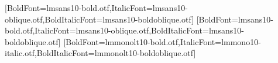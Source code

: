 \RequirePackage{fontspec}
\RequirePackage{unicode-math}
\setmainfont{lmsans10-regular.otf}[BoldFont=lmsans10-bold.otf,ItalicFont=lmsans10-oblique.otf,BoldItalicFont=lmsans10-boldoblique.otf]
\setsansfont{lmsans10-regular.otf}[BoldFont=lmsans10-bold.otf,ItalicFont=lmsans10-oblique.otf,BoldItalicFont=lmsans10-boldoblique.otf]
\setmonofont{lmmono10-regular.otf}[BoldFont=lmmonolt10-bold.otf,ItalicFont=lmmono10-italic.otf,BoldItalicFont=lmmonolt10-boldoblique.otf]
